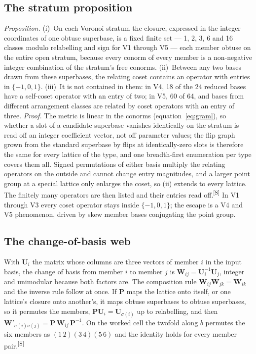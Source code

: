 \documentclass[preprint,pdf]{iucr}          %
\makeatletter
\newcommand{\Pop}{\mathbf{P}}
\newcommand{\Wop}{\mathbf{W}}
\newcommand{\Uop}{\mathbf{U}}
\newcommand{\chk}[1]{\textsuperscript{[S\@nameuse{zn@#1}]}}
\makeatother
\begin{document}
\subsection{The stratum proposition}
\emph{Proposition.} (i)~On each Voronoi stratum the closure, expressed in the integer coordinates of one obtuse superbase, is a fixed finite set --- 1, 2, 3, 6 and 16 classes modulo relabelling and sign for V1 through V5 --- each member obtuse on the entire open stratum, because every conorm of every member is a non-negative integer combination of the stratum's free conorms. (ii)~Between any two bases drawn from these superbases, the relating coset contains an operator with entries in $\{-1,0,1\}$. (iii)~It is not contained in them: in V4, 18 of the 24 reduced bases have a self-coset operator with an entry of two; in V5, 60 of 64, and bases from different arrangement classes are related by coset operators with an entry of three. \emph{Proof.} The metric is linear in the conorms (equation~\ref{eq:gram}), so whether a slot of a candidate superbase vanishes identically on the stratum is read off an integer coefficient vector, not off parameter values; the flip graph grown from the standard superbase by flips at identically-zero slots is therefore the same for every lattice of the type, and one breadth-first enumeration per type covers them all. Signed permutations of either basis multiply the relating operators on the outside and cannot change entry magnitudes, and a larger point group at a special lattice only enlarges the coset, so (ii) extends to every lattice. The finitely many operators are then listed and their entries read off.\chk{z:brute-complete} In V1 through V3 every coset operator stays inside $\{-1,0,1\}$; the escape is a V4 and V5 phenomenon, driven by skew member bases conjugating the point group.

\subsection{The change-of-basis web}
With $\Uop_i$ the matrix whose columns are three vectors of member $i$ in the input basis, the change of basis from member $i$ to member $j$ is $\Wop_{ij}=\Uop_i^{-1}\Uop_j$, integer and unimodular because both factors are. The composition rule $\Wop_{ij}\Wop_{jk}=\Wop_{ik}$ and the inverse rule follow at once. If $\Pop$ maps the lattice onto itself, or one lattice's closure onto another's, it maps obtuse superbases to obtuse superbases, so it permutes the members, $\Pop\Uop_i=\Uop_{\sigma(i)}$ up to relabelling, and then $\Wop'_{\sigma(i)\sigma(j)}=\Pop\,\Wop_{ij}\,\Pop^{-1}$. On the worked cell the twofold along $b$ permutes the six members as $(1\,2)(3\,4)(5\,6)$ and the identity holds for every member pair.\chk{z:transport}
\end{document}
